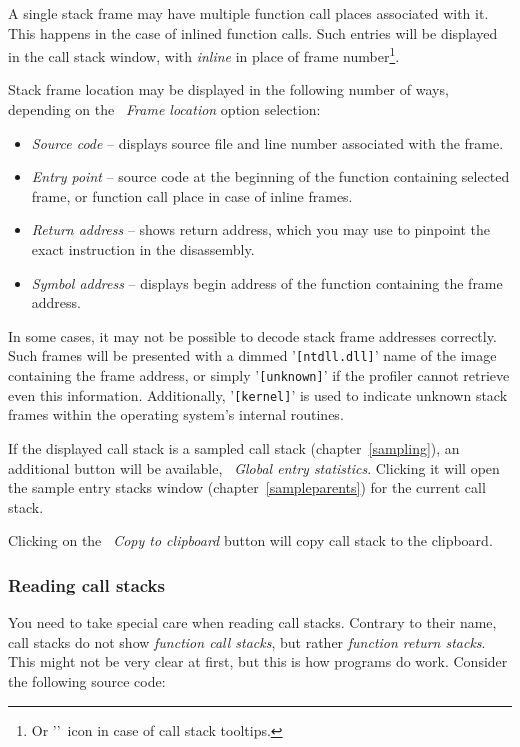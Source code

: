 \documentclass[hidelinks,titlepage,a4paper,twoside]{article}
\begin{document}
A single stack frame may have multiple function call places associated with it. This happens in the case of inlined function calls. Such entries will be displayed in the call stack window, with \emph{inline} in place of frame number\footnote{Or '\faCaretRight{}'~icon in case of call stack tooltips.}.

Stack frame location may be displayed in the following number of ways, depending on the \emph{\faAt{}~Frame location} option selection:

\begin{itemize}
\item \emph{Source code} -- displays source file and line number associated with the frame.
\item \emph{Entry point} -- source code at the beginning of the function containing selected frame, or function call place in case of inline frames.
\item \emph{Return address} -- shows return address, which you may use to pinpoint the exact instruction in the disassembly.
\item \emph{Symbol address} -- displays begin address of the function containing the frame address.
\end{itemize}

In some cases, it may not be possible to decode stack frame addresses correctly. Such frames will be presented with a dimmed '\texttt{[ntdll.dll]}' name of the image containing the frame address, or simply '\texttt{[unknown]}' if the profiler cannot retrieve even this information. Additionally, '\texttt{[kernel]}' is used to indicate unknown stack frames within the operating system's internal routines.

If the displayed call stack is a sampled call stack (chapter~\ref{sampling}), an additional button will be available, \emph{\faDoorOpen{}~Global entry statistics}. Clicking it will open the sample entry stacks window (chapter~\ref{sampleparents}) for the current call stack.

Clicking on the \emph{\faClipboard{}~Copy to clipboard} button will copy call stack to the clipboard.

\subsubsection{Reading call stacks}
\label{readingcallstacks}

You need to take special care when reading call stacks. Contrary to their name, call stacks do not show \emph{function call stacks}, but rather \emph{function return stacks}. This might not be very clear at first, but this is how programs do work. Consider the following source code:
\end{document}
